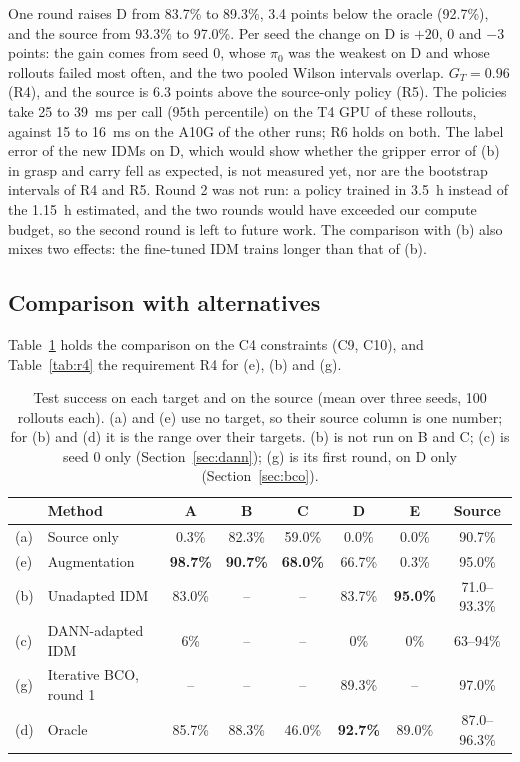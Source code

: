 \documentclass{article}
\begin{document}
One round raises D from 83.7\% to 89.3\%, 3.4 points below the oracle (92.7\%), and the
source from 93.3\% to 97.0\%. Per seed the change on D is $+20$, 0 and $-3$ points: the
gain comes from seed 0, whose $\pi_0$ was the weakest on D and whose rollouts failed most
often, and the two pooled Wilson intervals overlap. $G_T = 0.96$ (R4), and the source is
6.3 points above the source-only policy (R5). The policies take 25 to 39~ms per call (95th
percentile) on the T4 GPU of these rollouts, against 15 to 16~ms on the A10G of the other
runs; R6 holds on both. The label error of the new IDMs on D, which would show whether the
gripper error of (b) in grasp and carry fell as expected, is not measured yet, nor are the
bootstrap intervals of R4 and R5. Round 2 was not run: a policy trained in 3.5~h instead of
the 1.15~h estimated, and the two rounds would have exceeded our compute budget, so the
second round is left to future work. The comparison with (b) also mixes two effects: the
fine-tuned IDM trains longer than that of (b).

\subsection{Comparison with alternatives}
Table~\ref{tab:main} holds the comparison on the C4 constraints (C9, C10), and
Table~\ref{tab:r4} the requirement R4 for (e), (b) and (g).

\begin{table}[t]
  \caption{Test success on each target and on the source (mean over three seeds, 100
  rollouts each). (a) and (e) use no target, so their source column is one number; for (b)
  and (d) it is the range over their targets. (b) is not run on B and C; (c) is seed 0
  only (Section~\ref{sec:dann}); (g) is its first round, on D only (Section~\ref{sec:bco}).}
  \label{tab:main}
  \centering
  \small
  \begin{tabular}{@{}l@{\hspace{4pt}}lcccccc@{}}
    \toprule
    & Method & A & B & C & D & E & Source \\
    \midrule
    (a) & Source only & 0.3\% & 82.3\% & 59.0\% & 0.0\% & 0.0\% & 90.7\% \\
    (e) & Augmentation & \textbf{98.7\%} & \textbf{90.7\%} & \textbf{68.0\%} & 66.7\% & 0.3\% & 95.0\% \\
    (b) & Unadapted IDM & 83.0\% & -- & -- & 83.7\% & \textbf{95.0\%} & 71.0--93.3\% \\
    (c) & DANN-adapted IDM & 6\% & -- & -- & 0\% & 0\% & 63--94\% \\
    (g) & Iterative BCO, round 1 & -- & -- & -- & 89.3\% & -- & 97.0\% \\
    (d) & Oracle & 85.7\% & 88.3\% & 46.0\% & \textbf{92.7\%} & 89.0\% & 87.0--96.3\% \\
    \bottomrule
  \end{tabular}
\end{table}
\end{document}
